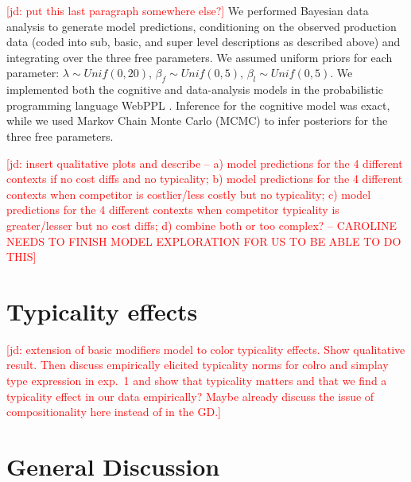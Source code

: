 \documentclass[11pt]{article}
\newcommand{\jd}[1]{\textcolor{Red}{[jd: #1]}}
\begin{document}
\jd{put this last paragraph somewhere else?}
We performed Bayesian data analysis to generate model predictions, conditioning on the observed production data (coded into sub, basic, and super level descriptions as described above) and integrating over the three free parameters.
We assumed uniform priors for each parameter: $\lambda  \sim Unif(0,20)$, $\beta_f \sim Unif(0,5)$, $\beta_l \sim Unif(0,5)$.
We implemented both the cognitive and data-analysis models in the probabilistic programming language WebPPL \cite{GoodmanStuhlmuller14_DIPPL}.
Inference for the cognitive model was exact, while we used Markov Chain Monte Carlo (MCMC) to infer posteriors for the three free parameters.

\jd{insert qualitative plots and describe -- a) model predictions for the 4 different contexts if no cost diffs and no typicality; b) model predictions for the 4 different contexts when competitor is costlier/less costly but no typicality; c) model predictions for the 4 different contexts when competitor typicality is greater/lesser but no cost diffs; d) combine both or too complex? -- CAROLINE NEEDS TO FINISH MODEL EXPLORATION FOR US TO BE ABLE TO DO THIS}


\section{Typicality effects}
\label{sec:typicality}

\jd{extension of basic modifiers model to color typicality effects. Show qualitative result. Then discuss empirically elicited typicality norms for colro and simplay type expression in exp.~1 and show that typicality matters and that we find a typicality effect in our data empirically? Maybe already discuss the issue of compositionality here instead of in the GD.}

\section{General Discussion}
\label{sec:gd}
\end{document}
